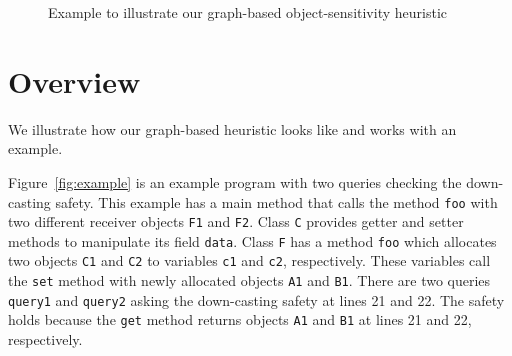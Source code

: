 \begin{figure}
\begin{multicols}{2}
\begin{flushright}
\end{flushright}
\end{multicols}
\caption{Example to illustrate our graph-based object-sensitivity heuristic}
\end{figure}


\section{Overview}
We illustrate how our graph-based heuristic looks like and works with an example. %





Figure~\ref{fig:example} is an example program with two queries checking the down-casting safety.
This example has a main method that calls the method {\tt foo} with two different receiver objects {\tt F1} and {\tt F2}.
Class {\tt C} provides getter and setter methods to manipulate its field {\tt data}.
Class {\tt F} has a method {\tt foo} which allocates two
objects {\tt C1} and {\tt C2} to variables {\tt c1} and {\tt c2}, respectively.
These variables call the {\tt set} method with newly allocated objects {\tt A1} and {\tt B1}.
There are two queries {\tt query1} and {\tt query2} asking the down-casting safety at lines 21 and 22.
The safety holds because the {\tt get} method returns objects {\tt A1} and {\tt B1} at lines 21 and 22, respectively.



